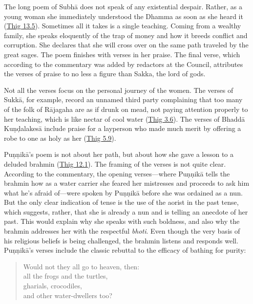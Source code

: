\documentclass[12pt,openany]{book}%
\begin{document}
The long poem of \textsanskrit{Subhā} does not speak of any existential despair. Rather, as a young woman she immediately understood the Dhamma as soon as she heard it (\href{https://suttacentral.net/thig13.5}{Thig 13.5}). Sometimes all it takes is a single teaching. Coming from a wealthy family, she speaks eloquently of the trap of money and how it breeds conflict and corruption. She declares that she will cross over on the same path traveled by the great sages. The poem finishes with verses in her praise. The final verse, which according to the commentary was added by redactors at the Council, attributes the verses of praise to no less a figure than Sakka, the lord of gods.

Not all the verses focus on the personal journey of the women. The verses of \textsanskrit{Sukkā}, for example, record an unnamed third party complaining that too many of the folk of \textsanskrit{Rājagaha} are as if drunk on mead, not paying attention properly to her teaching, which is like nectar of cool water (\href{https://suttacentral.net/thig3.6}{Thig 3.6}). The verses of \textsanskrit{Bhaddā} \textsanskrit{Kuṇḍalakesā} include praise for a layperson who made much merit by offering a robe to one as holy as her (\href{https://suttacentral.net/thig5.9}{Thig 5.9}).

\textsanskrit{Puṇṇikā}’s poem is not about her path, but about how she gave a lesson to a deluded brahmin (\href{https://suttacentral.net/thig12.1}{Thig 12.1}). The framing of the verses is not quite clear. According to the commentary, the opening verses—where \textsanskrit{Puṇṇikā} tells the brahmin how as a water carrier she feared her mistresses and proceeds to ask him what he’s afraid of—were spoken by \textsanskrit{Puṇṇikā} before she was ordained as a nun. But the only clear indication of tense is the use of the aorist in the past tense, which suggests, rather, that she is already a nun and is telling an anecdote of her past. This would explain why she speaks with such boldness, and also why the brahmin addresses her with the respectful \textit{bhoti}. Even though the very basis of his religious beliefs is being challenged, the brahmin listens and responds well. \textsanskrit{Puṇṇikā}’s verses include the classic rebuttal to the efficacy of bathing for purity:

\begin{verse}%
Would not they all go to heaven, then: \\
all the frogs and the turtles, \\
gharials, crocodiles, \\
and other water-dwellers too?

%
\end{verse}
\end{document}
